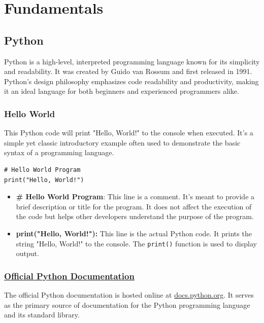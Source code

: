 \section{Fundamentals}

\subsection{Python}
Python is a high-level, interpreted programming language known for its simplicity and readability. It was created by Guido van Rossum and first released in 1991. Python's design philosophy emphasizes code readability and productivity, making it an ideal language for both beginners and experienced programmers alike.

\subsubsection{Hello World}
This Python code will print "Hello, World!" to the console when executed. It's a simple yet classic introductory example often used to demonstrate the basic syntax of a programming language.

\begin{codebox}
\begin{verbatim}
# Hello World Program
print("Hello, World!")
\end{verbatim}
\end{codebox}

\begin{itemize}
    \item \textbf{\# Hello World Program}: This line is a comment. It's meant to provide a brief description or title for the program. It does not affect the execution of the code but helps other developers understand the purpose of the program.
    \item \textbf{print("Hello, World!"):} This line is the actual Python code. It prints the string "Hello, World!" to the console. The \texttt{print()} function is used to display output.
\end{itemize}

\subsubsection{\href{https://docs.python.org/3/}{Official Python Documentation}}
The official Python documentation is hosted online at \href{https://docs.python.org/3/}{docs.python.org}. It serves as the primary source of documentation for the Python programming language and its standard library.

